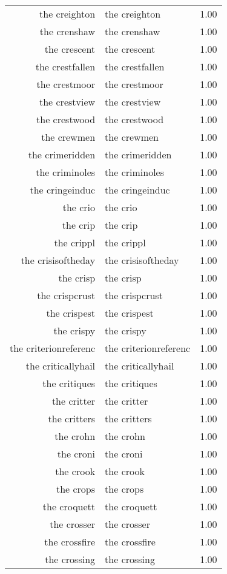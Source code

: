 \begin{table}[ht]
\begin{tabular}{rlr}
  the creighton & the creighton & 1.00 \\ 
  the crenshaw & the crenshaw & 1.00 \\ 
  the crescent & the crescent & 1.00 \\ 
  the crestfallen & the crestfallen & 1.00 \\ 
  the crestmoor & the crestmoor & 1.00 \\ 
  the crestview & the crestview & 1.00 \\ 
  the crestwood & the crestwood & 1.00 \\ 
  the crewmen & the crewmen & 1.00 \\ 
  the crimeridden & the crimeridden & 1.00 \\ 
  the criminoles & the criminoles & 1.00 \\ 
  the cringeinduc & the cringeinduc & 1.00 \\ 
  the crio & the crio & 1.00 \\ 
  the crip & the crip & 1.00 \\ 
  the crippl & the crippl & 1.00 \\ 
  the crisisoftheday & the crisisoftheday & 1.00 \\ 
  the crisp & the crisp & 1.00 \\ 
  the crispcrust & the crispcrust & 1.00 \\ 
  the crispest & the crispest & 1.00 \\ 
  the crispy & the crispy & 1.00 \\ 
  the criterionreferenc & the criterionreferenc & 1.00 \\ 
  the criticallyhail & the criticallyhail & 1.00 \\ 
  the critiques & the critiques & 1.00 \\ 
  the critter & the critter & 1.00 \\ 
  the critters & the critters & 1.00 \\ 
  the crohn & the crohn & 1.00 \\ 
  the croni & the croni & 1.00 \\ 
  the crook & the crook & 1.00 \\ 
  the crops & the crops & 1.00 \\ 
  the croquett & the croquett & 1.00 \\ 
  the crosser & the crosser & 1.00 \\ 
  the crossfire & the crossfire & 1.00 \\ 
  the crossing & the crossing & 1.00 \\ 

\end{tabular}
\end{table}
